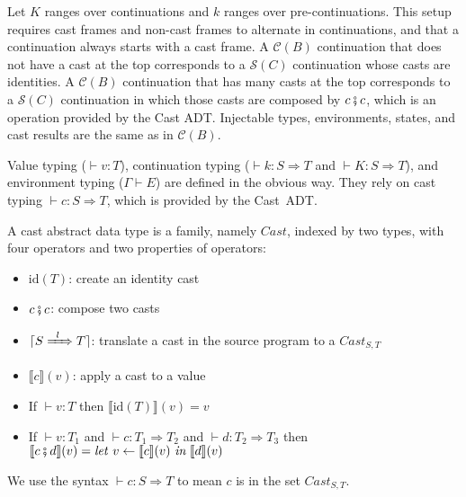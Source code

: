 \documentclass[runningheads]{llncs}
\newcommand{\CMachine}[1]{\ensuremath{\mathcal{C}(#1)}}
\newcommand{\CBMachine}[0]{\CMachine{B}}
\newcommand{\SMachine}[1]{\ensuremath{\mathcal{S}(#1)}}
\newcommand{\ccast}[3]{#1 \xRightarrow[]{\enskip #2 \enskip} #3}
\newcommand{\mlet}[3]{\ensuremath{
\mathit{let}\ {#1\leftarrow#2}\ \mathit{in}\;#3}}
\newcommand{\denote}[1]{\ensuremath{\llbracket #1 \rrbracket}}
\newcommand{\compose}[2]{\ensuremath{#1 \fatsemi #2}}
\newcommand{\translate}[1]{\ensuremath{\lceil#1\rceil}}
\newcommand{\id}[1]{\ensuremath{\mathrm{id}(#1)}}
\newcommand{\valuetyping}[2]{\ensuremath{\vdash #1 : #2}}
\newcommand{\envtyping}[2]{\ensuremath{#1 \vdash #2}}
\newcommand{\casttyping}[3]{\ensuremath{\vdash #1 : #2 \Longrightarrow #3}}
\begin{document}
Let $K$ ranges over continuations and $k$ ranges over
pre-continuations.  This setup requires cast frames and non-cast
frames to alternate in continuations, and that a continuation always
starts with a cast frame.
A \CMachine{B} continuation that does not have a cast at the top
corresponds to a \SMachine{C} continuation whose casts are identities.
A \CMachine{B} continuation that has many casts at the top corresponds
to a \SMachine{C} continuation in which those casts are composed by
$\compose{c}{c}$, which is an operation provided by the Cast ADT.
%
Injectable types, environments, states, and cast results are the same
as in \CBMachine.

Value typing (\valuetyping{v}{T}), continuation typing
(\casttyping{k}{S}{T} and \casttyping{K}{S}{T}), and environment
typing (\envtyping{\Gamma}{E}) are defined in the obvious way.  They
rely on cast typing \casttyping{c}{S}{T}, which is provided by the
Cast~ADT.

\begin{definition}
	\label{def:cast-rep}
	A cast abstract data type is a family, namely $Cast$, indexed by two types, 
	with four operators and two properties of operators:
\begin{itemize}
	\item $\id{T}$: create an identity cast
	\item $\compose{c}{c}$: compose two casts
	\item $\translate{\ccast{S}{l}{T}}$: translate a cast in the source 
		program to a $\textit{Cast}_{S,T}$
	\item $\denote{c}(v)$: apply a cast to a value
	\item If $ \valuetyping{v}{T} $ then $\denote{\id{T}}(v)=v$
	\item If $ \valuetyping{v}{T_1} $ and
		$ \casttyping{c}{T_1}{T_2} $ and
		$ \casttyping{d}{T_2}{T_3} $ 
		then 
        $ \denote{\compose{c}{d}}(v) = \mlet{v}{\denote{c}(v)}{\denote{d}(v)}$
\end{itemize}
We use the syntax \casttyping{c}{S}{T} to mean $c$ is in the set 
$\textit{Cast}_{S,T}$.
\end{definition}
\end{document}
